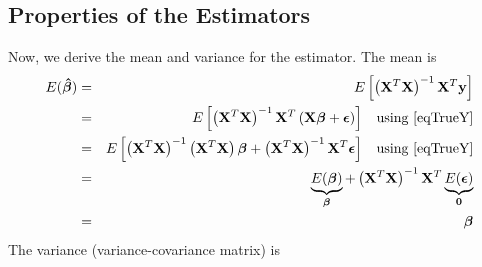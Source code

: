 \documentclass[11pt]{article}
\theoremstyle{remark}
\begin{document}
\subsection{Properties of the Estimators}
Now, we derive the mean and variance for the estimator. The mean is
\begin{eqnarray}
E(\boldsymbol{\hat{\beta}}) &=& E\left[  \left(\bold{X}^T\bold{X}\right)^{-1}\bold{X}^T\bold{y} \right]\nonumber\\
&=& E\left[  \left(\bold{X}^T\bold{X}\right)^{-1}\bold{X}^T\left(\bold{X}\boldsymbol{\beta} + \boldsymbol{\epsilon}\right) \right]\:\:\:\:\text{using \eqref{eqTrueY}}\nonumber\\
&=& E\left[  \left(\bold{X}^T\bold{X}\right)^{-1}\left(\bold{X}^T\bold{X}\right)\boldsymbol{\beta} + \left(\bold{X}^T\bold{X}\right)^{-1}\bold{X}^T\boldsymbol{\epsilon} \right]\:\:\:\:\text{using \eqref{eqTrueY}}\nonumber\\
&=& \underbrace{E(\boldsymbol{\beta})}_{\boldsymbol{\beta}}+ \left(\bold{X}^T\bold{X}\right)^{-1}\bold{X}^T\underbrace{E(\boldsymbol{\epsilon})}_{\bold{0}}\nonumber\\
&=& \boldsymbol{\beta} \label{MeanEstimatorBeta}
\end{eqnarray}
The variance (variance-covariance matrix) is
\end{document}
